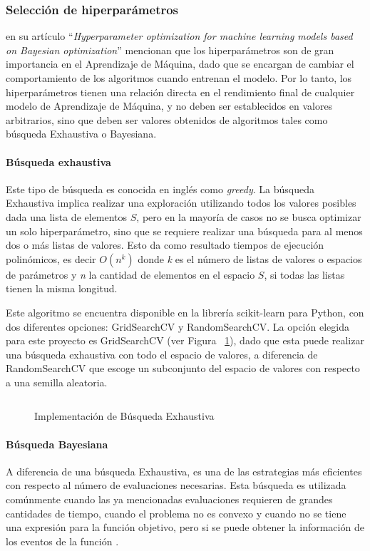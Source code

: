\subsubsection{Selección de hiperparámetros}
\textcite{Wu2019} en su artículo \enquote{\textit{Hyperparameter optimization for machine learning models based on Bayesian optimization}} mencionan que los hiperparámetros son de gran importancia en el Aprendizaje de Máquina, dado que se encargan de cambiar el comportamiento de los algoritmos cuando entrenan el modelo. Por lo tanto, los hiperparámetros tienen una relación directa en el rendimiento final de cualquier modelo de Aprendizaje de Máquina, y no deben ser establecidos en valores arbitrarios, sino que deben ser valores obtenidos de algoritmos tales como búsqueda Exhaustiva o Bayesiana.

\paragraph{Búsqueda exhaustiva} Este tipo de búsqueda es conocida en inglés como \textit{greedy}. La búsqueda Exhaustiva implica realizar una exploración utilizando todos los valores posibles dada una lista de elementos $S$, pero en la mayoría de casos no se busca optimizar un solo hiperparámetro, sino que se requiere realizar una búsqueda para al menos dos o más listas de valores. Esto da como resultado tiempos de ejecución polinómicos, es decir $O(n^k)$ donde \textit{k} es el número de listas de valores o espacios de parámetros y \textit{n} la cantidad de elementos en el espacio $S$, si todas las listas tienen la misma longitud.

Este algoritmo se encuentra disponible en la librería scikit-learn \parencite{sklearn_api} para Python, con dos diferentes opciones: GridSearchCV y RandomSearchCV. La opción elegida para este proyecto es GridSearchCV (ver Figura ~\ref{fig:impbusexh}), dado que esta puede realizar una búsqueda exhaustiva con todo el espacio de valores, a diferencia de RandomSearchCV que escoge un subconjunto del espacio de valores con respecto a una semilla aleatoria.

\begin{figure}[H]
    \centering
    \caption{Implementación de Búsqueda Exhaustiva}
    \inputminted{Python}{pycode/gridsearch.py}
    \label{fig:impbusexh}
\end{figure}

\paragraph{Búsqueda Bayesiana} A diferencia de una búsqueda Exhaustiva, es una de las estrategias más eficientes con respecto al número de evaluaciones necesarias. Esta búsqueda es utilizada comúnmente cuando las ya mencionadas evaluaciones requieren de grandes cantidades de tiempo, cuando el problema no es convexo y cuando no se tiene una expresión para la función objetivo, pero si se puede obtener la información de los eventos de la función \parencite{Brochu2010}.

